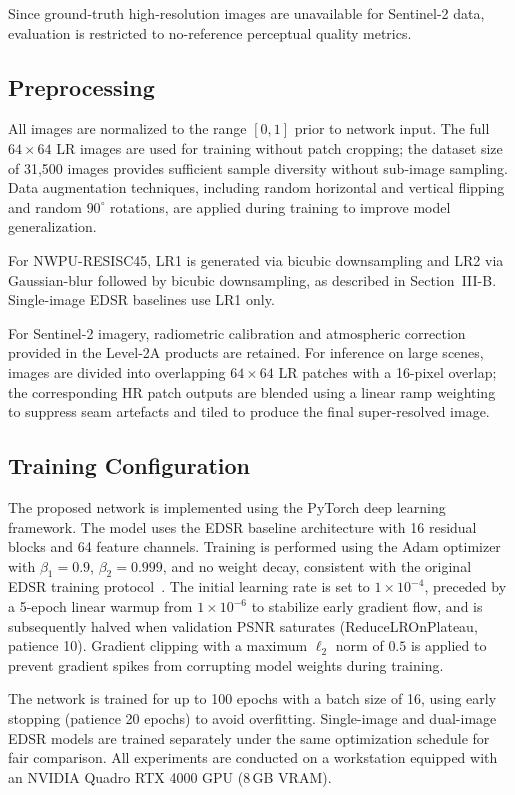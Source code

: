 \documentclass[conference]{IEEEtran}
\begin{document}
Since ground-truth high-resolution images are unavailable for Sentinel-2 data, evaluation is restricted to no-reference perceptual quality metrics.

\subsection{Preprocessing}

All images are normalized to the range $[0,1]$ prior to network input. The full $64 \times 64$ LR images are used for training without patch cropping; the dataset size of 31,500 images provides sufficient sample diversity without sub-image sampling. Data augmentation techniques, including random horizontal and vertical flipping and random $90^{\circ}$ rotations, are applied during training to improve model generalization.

For NWPU-RESISC45, LR1 is generated via bicubic downsampling and LR2 via Gaussian-blur followed by bicubic downsampling, as described in Section~III-B. Single-image EDSR baselines use LR1 only.

For Sentinel-2 imagery, radiometric calibration and atmospheric correction provided in the Level-2A products are retained. For inference on large scenes, images are divided into overlapping $64 \times 64$ LR patches with a 16-pixel overlap; the corresponding HR patch outputs are blended using a linear ramp weighting to suppress seam artefacts and tiled to produce the final super-resolved image.

\subsection{Training Configuration}

The proposed network is implemented using the PyTorch deep learning framework. The model uses the EDSR baseline architecture with 16 residual blocks and 64 feature channels. Training is performed using the Adam optimizer with $\beta_{1}=0.9$, $\beta_{2}=0.999$, and no weight decay, consistent with the original EDSR training protocol~\cite{lim2017edsr}. The initial learning rate is set to $1 \times 10^{-4}$, preceded by a 5-epoch linear warmup from $1 \times 10^{-6}$ to stabilize early gradient flow, and is subsequently halved when validation PSNR saturates (ReduceLROnPlateau, patience 10). Gradient clipping with a maximum $\ell_2$ norm of $0.5$ is applied to prevent gradient spikes from corrupting model weights during training.

The network is trained for up to 100 epochs with a batch size of 16, using early stopping (patience 20 epochs) to avoid overfitting. Single-image and dual-image EDSR models are trained separately under the same optimization schedule for fair comparison. All experiments are conducted on a workstation equipped with an NVIDIA Quadro RTX 4000 GPU (8\,GB VRAM).
\end{document}
